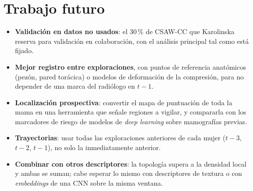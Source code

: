 \section{Trabajo futuro}
\begin{itemize}
  \item \textbf{Validación en datos no usados}: el 30\,\% de CSAW-CC que
        Karolinska reserva para validación en colaboración, con el análisis
        principal tal como está fijado.
  \item \textbf{Mejor registro entre exploraciones}, con puntos de
        referencia anatómicos (pezón, pared torácica) o modelos de
        deformación de la compresión, para no depender de una marca del
        radiólogo en $t-1$.
  \item \textbf{Localización prospectiva}: convertir el mapa de puntuación
        de toda la mama en una herramienta que señale regiones a vigilar, y
        compararla con los marcadores de riesgo de modelos de
        \textit{deep learning} sobre mamografías previas.
  \item \textbf{Trayectorias}: usar todas las exploraciones anteriores de
        cada mujer ($t-3$, $t-2$, $t-1$), no solo la inmediatamente
        anterior.
  \item \textbf{Combinar con otros descriptores}: la topología supera a la
        densidad local y ambas se suman; cabe esperar lo mismo con
        descriptores de textura o con \textit{embeddings} de una CNN sobre
        la misma ventana.
\end{itemize}
